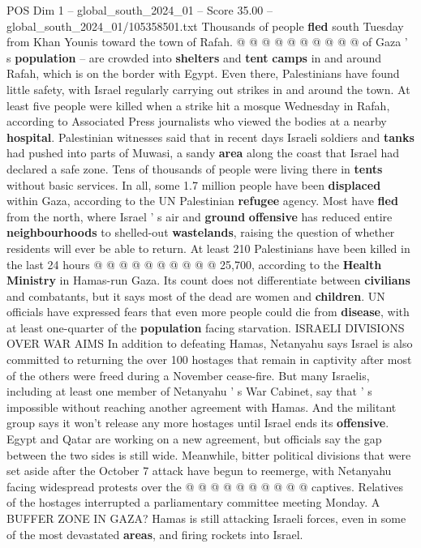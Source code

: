 \begin{textsample}{POS Dim 1 – global\_south\_2024\_01 – Score 35.00 – global\_south\_2024\_01/105358501.txt}
Thousands of people \textbf{fled} south Tuesday from Khan Younis toward the town of Rafah. @ @ @ @ @ @ @ @ @ @ of Gaza ' s \textbf{population} -- are crowded into \textbf{shelters} and \textbf{tent} \textbf{camps} in and around Rafah, which is on the border with Egypt.
Even there, Palestinians have found little safety, with Israel regularly carrying out strikes in and around the town.
At least five people were killed when a strike hit a mosque Wednesday in Rafah, according to Associated Press journalists who viewed the bodies at a nearby \textbf{hospital}.
Palestinian witnesses said that in recent days Israeli soldiers and \textbf{tanks} had pushed into parts of Muwasi, a sandy \textbf{area} along the coast that Israel had declared a safe zone.
Tens of thousands of people were living there in \textbf{tents} without basic services.
In all, some 1.7 million people have been \textbf{displaced} within Gaza, according to the UN Palestinian \textbf{refugee} agency.
Most have \textbf{fled} from the north, where Israel ' s air and \textbf{ground} \textbf{offensive} has reduced entire \textbf{neighbourhoods} to shelled-out \textbf{wastelands}, raising the question of whether residents will ever be able to return.
At least 210 Palestinians have been killed in the last 24 hours @ @ @ @ @ @ @ @ @ @ 25,700, according to the \textbf{Health} \textbf{Ministry} in Hamas-run Gaza.
Its count does not differentiate between \textbf{civilians} and combatants, but it says most of the dead are women and \textbf{children}.
UN officials have expressed fears that even more people could die from \textbf{disease}, with at least one-quarter of the \textbf{population} facing starvation.
ISRAELI DIVISIONS OVER WAR AIMS In addition to defeating Hamas, Netanyahu says Israel is also committed to returning the over 100 hostages that remain in captivity after most of the others were freed during a November cease-fire.
But many Israelis, including at least one member of Netanyahu ' s War Cabinet, say that ' s impossible without reaching another agreement with Hamas.
And the militant group says it won't release any more hostages until Israel ends its \textbf{offensive}.
Egypt and Qatar are working on a new agreement, but officials say the gap between the two sides is still wide.
Meanwhile, bitter political divisions that were set aside after the October 7 attack have begun to reemerge, with Netanyahu facing widespread protests over the @ @ @ @ @ @ @ @ @ @ captives.
Relatives of the hostages interrupted a parliamentary committee meeting Monday.
A BUFFER ZONE IN GAZA?
Hamas is still attacking Israeli forces, even in some of the most devastated \textbf{areas}, and firing rockets into Israel.

\end{textsample}
